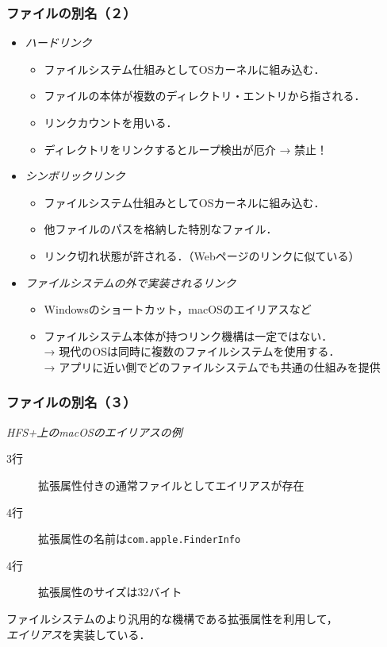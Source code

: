 \documentclass{beamer}                   %
\begin{document}
\begin{frame}
  \frametitle{ファイルの別名（２）}
  \begin{itemize}
  \item \emph{ハードリンク} \\
    \begin{itemize}
    \item ファイルシステム仕組みとしてOSカーネルに組み込む．
    \item ファイルの本体が複数のディレクトリ・エントリから指される．
    \item リンクカウントを用いる．
    \item ディレクトリをリンクするとループ検出が厄介 → 禁止！
    \end{itemize}
  \item \emph{シンボリックリンク} \\
    \begin{itemize}
    \item ファイルシステム仕組みとしてOSカーネルに組み込む．
    \item 他ファイルのパスを格納した特別なファイル．
    \item リンク切れ状態が許される．（Webページのリンクに似ている）
    \end{itemize}
  \item \emph{ファイルシステムの外で実装されるリンク} \\
    \begin{itemize}
    \item Windowsのショートカット，macOSのエイリアスなど
    \item ファイルシステム本体が持つリンク機構は一定ではない． \\
      → 現代のOSは同時に複数のファイルシステムを使用する．\\
      → アプリに近い側でどのファイルシステムでも共通の仕組みを提供
    \end{itemize}
  \end{itemize}
\end{frame}

\begin{frame}
  \frametitle{ファイルの別名（３）}
  \emph{HFS+上のmacOSのエイリアスの例}
  \begin{quote}
  \end{quote}
  \begin{description}
    \item[3行] 拡張属性付きの通常ファイルとしてエイリアスが存在
    \item[4行] 拡張属性の名前は\texttt{com.apple.FinderInfo}
    \item[4行] 拡張属性のサイズは32バイト
  \end{description}
  ファイルシステムのより汎用的な機構である拡張属性を利用して，\\
  \emph{エイリアス}を実装している．
  \vfill
\end{frame}
\end{document}
